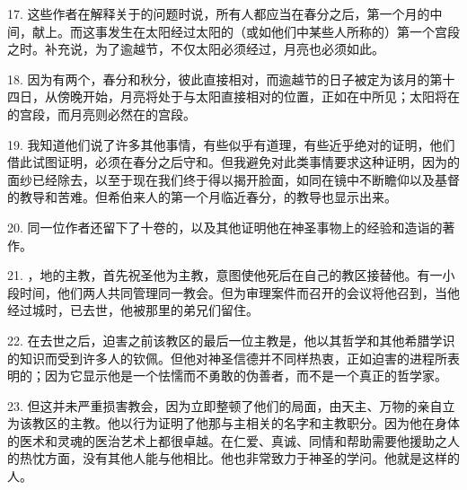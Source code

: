 17. 这些作者在解释关于的问题时说，所有人都应当在春分之后，第一个月的中间，献上。而这事发生在太阳经过太阳的（或如他们中某些人所称的）第一个宫段之时。补充说，为了逾越节，不仅太阳必须经过，月亮也必须如此。\par

18. 因为有两个，春分和秋分，彼此直接相对，而逾越节的日子被定为该月的第十四日，从傍晚开始，月亮将处于与太阳直接相对的位置，正如在中所见；太阳将在的宫段，而月亮则必然在的宫段。\par

19. 我知道他们说了许多其他事情，有些似乎有道理，有些近乎绝对的证明，他们借此试图证明，必须在春分之后守和。但我避免对此类事情要求这种证明，因为的面纱已经除去，以至于现在我们终于得以揭开脸面，如同在镜中不断瞻仰以及基督的教导和苦难。但希伯来人的第一个月临近春分，的教导也显示出来。\par

20. 同一位作者还留下了十卷的，以及其他证明他在神圣事物上的经验和造诣的著作。\par

21. ，地的主教，首先祝圣他为主教，意图使他死后在自己的教区接替他。有一小段时间，他们两人共同管理同一教会。但为审理案件而召开的会议将他召到，当他经过城时，已去世，他被那里的弟兄们留住。\par

22. 在去世之后，迫害之前该教区的最后一位主教是，他以其哲学和其他希腊学识的知识而受到许多人的钦佩。但他对神圣信德并不同样热衷，正如迫害的进程所表明的；因为它显示他是一个怯懦而不勇敢的伪善者，而不是一个真正的哲学家。\par

23. 但这并未严重损害教会，因为立即整顿了他们的局面，由天主、万物的亲自立为该教区的主教。他以行为证明了他那与主相关的名字和主教职分。因为他在身体的医术和灵魂的医治艺术上都很卓越。在仁爱、真诚、同情和帮助需要他援助之人的热忱方面，没有其他人能与他相比。他也非常致力于神圣的学问。他就是这样的人。\par

